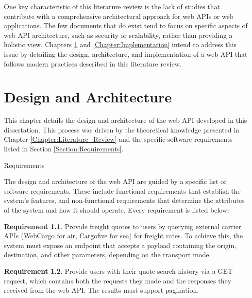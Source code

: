 \documentclass[12pt, reqno]{amsbook}
\makeatletter
\def\section{\@startsection{section}{1}%
      \z@{.5\linespacing\@plus.7\linespacing}{.25\linespacing}%
      {\normalfont\bfseries\flushleft}}
\theoremstyle{definition}
\theoremstyle{definition}
\newtheorem{requirement}{Requirement}
\numberwithin{section}{chapter}
\numberwithin{table}{chapter}
\numberwithin{figure}{chapter}
\makeatother
\begin{document}
One key characteristic of this literature review is the lack of studies that contribute with a comprehensive architectural approach for web \acp{API} or web applications. The few documents that do exist tend to focus on specific aspects of web \ac{API} architecture, such as security or scalability, rather than providing a holistic view. Chapters \ref{Chapter:Design_And_Architecture} and \ref{Chapter:Implementation} intend to address this issue by detailing the design, architecture, and implementation of a web \ac{API} that follows modern practices described in this literature review.

\chapter{Design and Architecture}
\label{Chapter:Design_And_Architecture}

This chapter details the design and architecture of the web \ac{API} developed in this dissertation. This process was driven by the theoretical knowledge presented in Chapter \ref{Chapter:Literature_Review} and the specific software requirements listed in Section \ref{Section:Requirements}.

\section{Requirements}
\label{Section:Requirements}

The design and architecture of the web \ac{API} are guided by a specific list of software requirements. These include functional requirements that establish the system's features, and non-functional requirements that determine the attributes of the system and how it should operate. Every requirement is listed below:

\begin{requirement}
  \label{Requirement:1}
  Provide freight quotes to users by querying external carrier \acp{API} (WebCargo for air, Cargofive for sea) for freight rates. To achieve this, the system must expose an endpoint that accepts a payload containing the origin, destination, and other parameters, depending on the transport mode.
\end{requirement}

\begin{requirement}
  \label{Requirement:2}
  Provide users with their quote search history via a GET request, which contains both the requests they made and the responses they received from the web \ac{API}. The results must support pagination.
\end{requirement}
\end{document}
